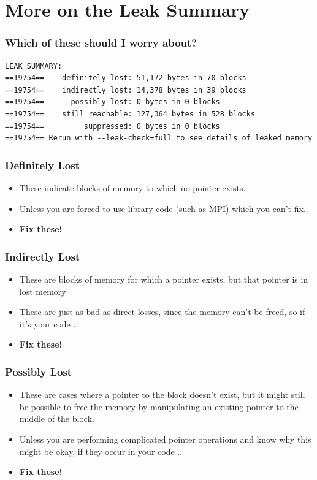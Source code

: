 \documentclass{beamer}
\begin{document}
\section{More on the Leak Summary}

\begin{frame}[fragile]
\frametitle{Which of these should I worry about?}
\begin{lstlisting}
LEAK SUMMARY:
==19754==    definitely lost: 51,172 bytes in 70 blocks
==19754==    indirectly lost: 14,378 bytes in 39 blocks
==19754==      possibly lost: 0 bytes in 0 blocks
==19754==    still reachable: 127,364 bytes in 528 blocks
==19754==         suppressed: 0 bytes in 0 blocks
==19754== Rerun with --leak-check=full to see details of leaked memory
\end{lstlisting}
\end{frame}

\begin{frame}[fragile]
  \frametitle{Definitely Lost}
  \begin{itemize}
    \item These indicate blocks of memory to which no pointer exists. 
    \item Unless you are forced to use library code (such as MPI) which you can't fix..
    \item \textbf{Fix these!}
  \end{itemize}
\end{frame}

\begin{frame}[fragile]
\frametitle{Indirectly Lost}
\begin{itemize}
\item These are blocks of memory for which a pointer exists, but that pointer is in lost memory
\item These are just as bad as direct losses, since the memory can't be freed, so if it's your code ..
\item \textbf{Fix these!}
\end{itemize}
\end{frame}

\begin{frame}[fragile]
\frametitle{Possibly Lost}
\begin{itemize}
\item These are cases where a pointer to the block doesn't exist, but it might still be possible to free the memory by manipulating an existing pointer to the middle of the block.
\item Unless you are performing complicated pointer operations and know why this might be okay, if they occur in your code ..
\item \textbf{Fix these!}
\end{itemize}
\end{frame}
\end{document}
